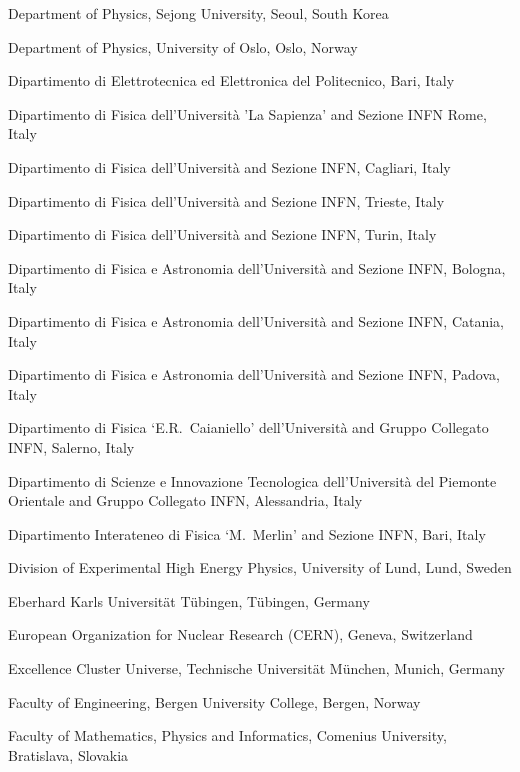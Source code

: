 \begin{flushleft}
\begin{Authlist}
\item {}Department of Physics, Sejong University, Seoul, South Korea
\item {}Department of Physics, University of Oslo, Oslo, Norway
\item {}Dipartimento di Elettrotecnica ed Elettronica del Politecnico, Bari, Italy
\item {}Dipartimento di Fisica dell'Universit\`{a} 'La Sapienza' and Sezione INFN Rome, Italy
\item {}Dipartimento di Fisica dell'Universit\`{a} and Sezione INFN, Cagliari, Italy
\item {}Dipartimento di Fisica dell'Universit\`{a} and Sezione INFN, Trieste, Italy
\item {}Dipartimento di Fisica dell'Universit\`{a} and Sezione INFN, Turin, Italy
\item {}Dipartimento di Fisica e Astronomia dell'Universit\`{a} and Sezione INFN, Bologna, Italy
\item {}Dipartimento di Fisica e Astronomia dell'Universit\`{a} and Sezione INFN, Catania, Italy
\item {}Dipartimento di Fisica e Astronomia dell'Universit\`{a} and Sezione INFN, Padova, Italy
\item {}Dipartimento di Fisica `E.R.~Caianiello' dell'Universit\`{a} and Gruppo Collegato INFN, Salerno, Italy
\item {}Dipartimento di Scienze e Innovazione Tecnologica dell'Universit\`{a} del  Piemonte Orientale and Gruppo Collegato INFN, Alessandria, Italy
\item {}Dipartimento Interateneo di Fisica `M.~Merlin' and Sezione INFN, Bari, Italy
\item {}Division of Experimental High Energy Physics, University of Lund, Lund, Sweden
\item {}Eberhard Karls Universit\"{a}t T\"{u}bingen, T\"{u}bingen, Germany
\item {}European Organization for Nuclear Research (CERN), Geneva, Switzerland
\item {}Excellence Cluster Universe, Technische Universit\"{a}t M\"{u}nchen, Munich, Germany
\item {}Faculty of Engineering, Bergen University College, Bergen, Norway
\item {}Faculty of Mathematics, Physics and Informatics, Comenius University, Bratislava, Slovakia

\end{Authlist}
\end{flushleft}
